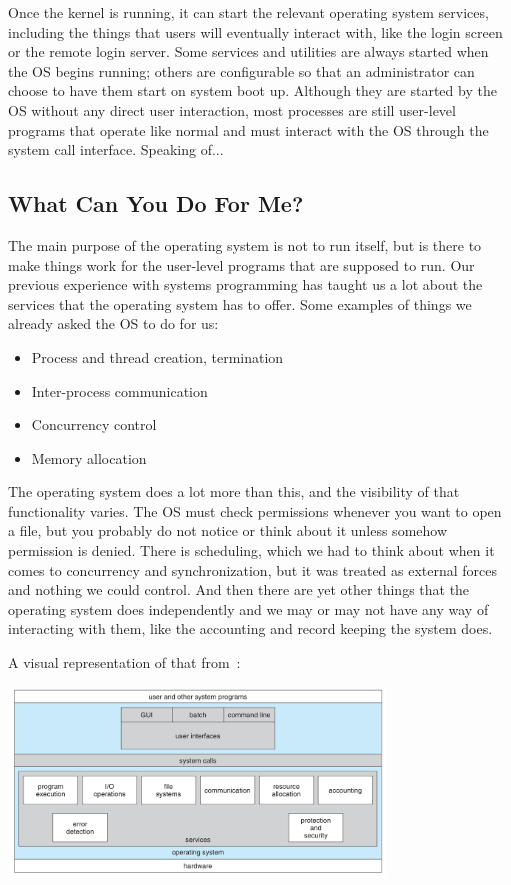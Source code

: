 Once the kernel is running, it can start the relevant operating system services, including the things that users will eventually interact with, like the login screen or the remote login server. Some services and utilities are always started when the OS begins running; others are configurable so that an administrator can choose to have them start on system boot up. Although they are started by the OS without any direct user interaction, most processes are still user-level programs that operate like normal and must interact with the OS through the system call interface. Speaking of...

\subsection*{What Can You Do For Me?}

The main purpose of the operating system is not to run itself, but is there to make things work for the user-level programs that are supposed to run. Our previous experience with systems programming has taught us a lot about the services that the operating system has to offer. Some examples of things we already asked the OS to do for us:
\begin{multicols}{2}
\begin{itemize}
	\item Process and thread creation, termination
	\item Inter-process communication
	\item Concurrency control
	\item Memory allocation
\end{itemize}
\end{multicols}

The operating system does a lot more than this, and the visibility of that functionality varies. The OS must check permissions whenever you want to open a file, but you probably do not notice or think about it unless somehow permission is denied. There is scheduling, which we had to think about when it comes to concurrency and synchronization, but it was treated as external forces and nothing we could control. And then there are yet other things that the operating system does independently and we may or may not have any way of interacting with them, like the accounting and record keeping the system does.

A visual representation of that from~\cite{osc}:
\begin{center}
	\includegraphics[width=0.75\textwidth]{images/os-structure.png}
\end{center}

